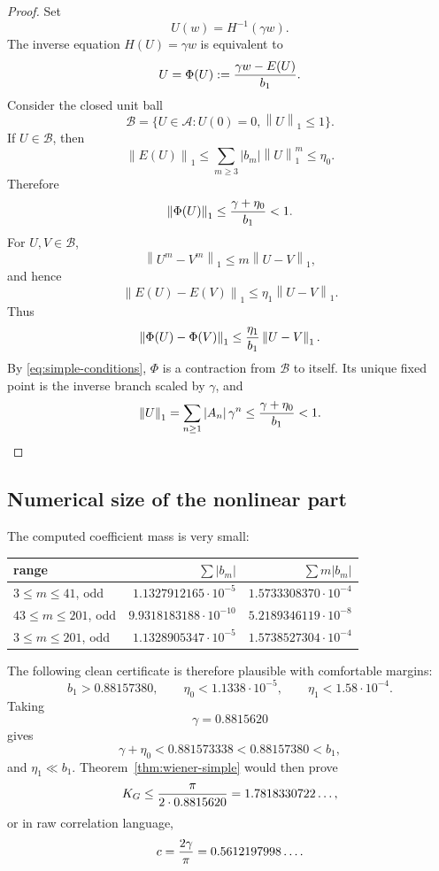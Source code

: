 \documentclass[11pt]{article}
\newcommand{\1}{\mathbf{1}}
\newcommand{\norm}[1]{\left\lVert #1\right\rVert}
\newcommand{\abs}[1]{\left\lvert #1\right\rvert}
\begin{document}
\begin{proof}
Set
\[
        U(w)=H^{-1}(\gamma w).
\]
The inverse equation \(H(U)=\gamma w\) is equivalent to
\begin{equation}\label{eq:fixed-point-U}
        U=\Phi(U):={\gamma w-E(U)\over b_1}.
\end{equation}
Consider the closed unit ball
\[
        \mathcal B=\{U\in\mathcal A: U(0)=0,
        \norm{U}_1\le1\}.
\]
If \(U\in\mathcal B\), then
\[
        \norm{E(U)}_1
        \le \sum_{m\ge3}\abs{b_m}\norm{U}_1^m
        \le \eta_0.
\]
Therefore
\[
        \norm{\Phi(U)}_1\le {\gamma+\eta_0\over b_1}<1.
\]
For \(U,V\in\mathcal B\),
\[
        \norm{U^m-V^m}_1\le m\norm{U-V}_1,
\]
and hence
\[
        \norm{E(U)-E(V)}_1\le \eta_1\norm{U-V}_1.
\]
Thus
\[
        \norm{\Phi(U)-\Phi(V)}_1
        \le {\eta_1\over b_1}\norm{U-V}_1.
\]
By \eqref{eq:simple-conditions}, \(\Phi\) is a contraction from \(\mathcal B\) to itself.  Its unique fixed point is the inverse branch scaled by \(\gamma\), and
\[
        \norm{U}_1=\sum_{n\ge1}\abs{A_n}\gamma^n
        \le {\gamma+\eta_0\over b_1}<1.
\]
\end{proof}

\subsection{Numerical size of the nonlinear part}

The computed coefficient mass is very small:
\begin{center}
\begin{tabular}{l r r}
\toprule
range & \(\sum \abs{b_m}\) & \(\sum m\abs{b_m}\) \\
\midrule
\(3\le m\le41\), odd & \(1.1327912165\cdot10^{-5}\) & \(1.5733308370\cdot10^{-4}\) \\
\(43\le m\le201\), odd & \(9.9318183188\cdot10^{-10}\) & \(5.2189346119\cdot10^{-8}\) \\
\(3\le m\le201\), odd & \(1.1328905347\cdot10^{-5}\) & \(1.5738527304\cdot10^{-4}\) \\
\bottomrule
\end{tabular}
\end{center}

The following clean certificate is therefore plausible with comfortable margins:
\begin{equation}\label{eq:target-basic-coeff-bounds}
        b_1>0.88157380,
        \qquad
        \eta_0<1.1338\cdot10^{-5},
        \qquad
        \eta_1<1.58\cdot10^{-4}.
\end{equation}
Taking
\[
        \gamma=0.8815620
\]
gives
\[
        \gamma+\eta_0<0.881573338<0.88157380<b_1,
\]
and \(\eta_1\ll b_1\).  Theorem~\ref{thm:wiener-simple} would then prove
\[
        K_G\le {\pi\over2\cdot0.8815620}
        =1.7818330722\ldots,
\]
or in raw correlation language,
\[
        c={2\gamma\over\pi}=0.5612197998\ldots.
\]
\end{document}

